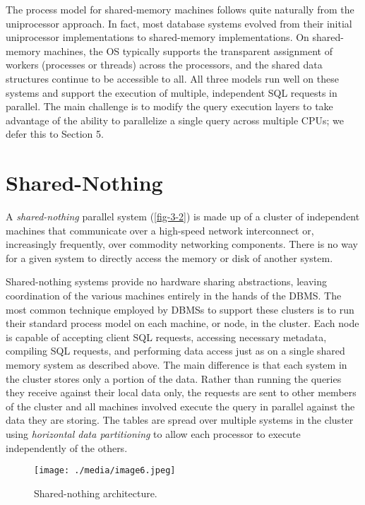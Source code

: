 \documentclass[b5paper,11pt,twoside,openright]{book}
\begin{document}
The process model for shared-memory machines follows quite naturally
from the uniprocessor approach. In fact, most database systems evolved
from their initial uniprocessor implementations to shared-memory
implementations. On shared-memory machines, the OS typically supports
the transparent assignment of workers (processes or
threads) across the processors, and the shared data structures continue
to be accessible to all. All three models run well on these systems and
support the execution of multiple, independent SQL requests in parallel.
The main challenge is to modify the query execution layers to take
advantage of the ability to parallelize a single query across multiple
CPUs; we defer this to Section 5.

\hypertarget{shared-nothing}{%
\section{Shared-Nothing}\label{shared-nothing}}

A \emph{shared-nothing} parallel system (\autoref{fig-3-2}) is made up of a
cluster of independent machines that communicate over a high-speed
network interconnect or, increasingly frequently, over commodity
networking components. There is no way for a given system to directly
access the memory or disk of another system.

Shared-nothing systems provide no hardware sharing abstractions, leaving
coordination of the various machines entirely in the hands of the DBMS.
The most common technique employed by DBMSs to support these clusters is
to run their standard process model on each machine, or node, in the
cluster. Each node is capable of accepting client SQL
requests, accessing necessary metadata, compiling SQL requests, and
performing data access just as on a single shared memory system as
described above. The main difference is that each system in the cluster
stores only a portion of the data. Rather than running the queries they
receive against their local data only, the requests are sent to other
members of the cluster and all machines involved execute the query in
parallel against the data they are storing. The tables are spread over
multiple systems in the cluster using \emph{horizontal data
partitioning} to allow each processor to execute independently of the
others.

\begin{figure}
\centering
\texttt{[image: ./media/image6.jpeg]}

\caption{Shared-nothing architecture.\label{fig-3-2}}
\end{figure}
\end{document}
